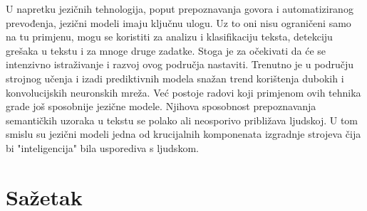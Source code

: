 \documentclass[times, utf8, diplomski, numeric]{fer}
\begin{document}
U napretku jezičnih tehnologija, poput prepoznavanja govora i automatiziranog prevođenja, jezični modeli imaju ključnu ulogu. Uz to oni nisu ograničeni samo na tu primjenu, mogu se koristiti za analizu i klasifikaciju teksta, detekciju grešaka u tekstu i za mnoge druge zadatke. Stoga je za očekivati da će se intenzivno istraživanje i razvoj ovog područja nastaviti. Trenutno je u području strojnog učenja i izadi prediktivnih modela snažan trend korištenja dubokih i konvolucijskih neuronskih mreža. Već postoje radovi koji primjenom ovih tehnika grade još sposobnije jezične modele. Njihova sposobnost prepoznavanja semantičkih uzoraka u tekstu se polako ali neosporivo približava ljudskoj. U tom smislu su jezični modeli jedna od krucijalnih komponenata izgradnje strojeva čija bi "inteligencija" bila usporediva s ljudskom.




\chapter{Sažetak}
\end{document}
